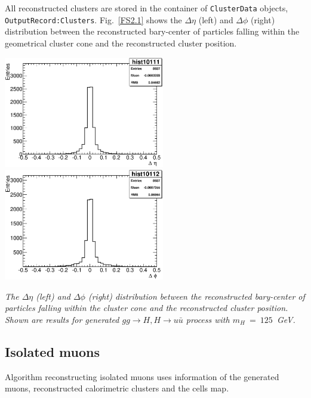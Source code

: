  All reconstructed clusters are stored in the container of {\tt ClusterData} objects,\\
{\tt OutputRecord:Clusters}.
 Fig.~\ref{FS2.1} shows the  $\Delta \eta$ (left) and  $\Delta \phi$ (right) distribution
 between the reconstructed bary-center of particles falling within the
 geometrical cluster cone  and the reconstructed cluster position.

\begin{Fighere}
\begin{center}
   \includegraphics[width=7.0cm,angle=0]{plot-etaclu.eps}
   \includegraphics[width=7.0cm,angle=0]{plot-phiclu.eps}
\end{center}
\caption{\em
The $\Delta \eta$ (left) and  $\Delta \phi$ (right) distribution
between the reconstructed bary-center of particles falling within the
cluster cone  and the reconstructed cluster position. Shown are results 
for generated  $gg \to H, H \to u \bar u$ process with $m_H~=~125$~GeV.
\label{FS2.1}} 
\end{Fighere}


\boldmath 
\subsection{Isolated muons}
\unboldmath

Algorithm reconstructing isolated muons uses information
of the generated muons, reconstructed calorimetric clusters and
the cells map.


